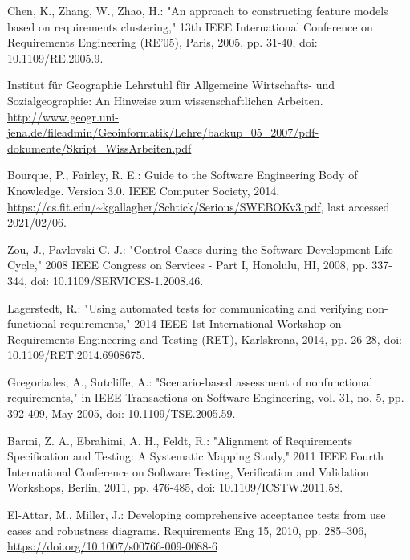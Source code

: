 \documentclass[a4paper,10pt, bibliography=totocnumbered]{scrreprt}
\begin{document}
\begin{thebibliography}{9}

 Chen, K., Zhang, W., Zhao, H.: "An approach to constructing feature models based on requirements clustering," 13th IEEE International Conference on Requirements Engineering (RE'05), Paris, 2005, pp. 31-40, doi: 10.1109/RE.2005.9.

 Institut für Geographie   
Lehrstuhl für Allgemeine Wirtschafts- und Sozialgeographie: An Hinweise zum wissenschaftlichen Arbeiten.
\url{http://www.geogr.uni-jena.de/fileadmin/Geoinformatik/Lehre/backup_05_2007/pdf-dokumente/Skript_WissArbeiten.pdf}

 Bourque, P., Fairley, R. E.: Guide to the Software Engineering Body of Knowledge. Version 3.0.
IEEE Computer Society, 2014. \url{https://cs.fit.edu/~kgallagher/Schtick/Serious/SWEBOKv3.pdf}, last accessed 2021/02/06.

 Zou, J., Pavlovski C. J.: "Control Cases during the Software Development Life-Cycle," 2008 IEEE Congress on Services - Part I, Honolulu, HI, 2008, pp. 337-344, doi: 10.1109/SERVICES-1.2008.46.

 Lagerstedt, R.: "Using automated tests for communicating and verifying non-functional requirements," 2014 IEEE 1st International Workshop on Requirements Engineering and Testing (RET), Karlskrona, 2014, pp. 26-28, doi: 10.1109/RET.2014.6908675.

 Gregoriades, A., Sutcliffe, A.: "Scenario-based assessment of nonfunctional requirements," in IEEE Transactions on Software Engineering, vol. 31, no. 5, pp. 392-409, May 2005, doi: 10.1109/TSE.2005.59.

 Barmi, Z. A., Ebrahimi, A. H., Feldt, R.: "Alignment of Requirements Specification and Testing: A Systematic Mapping Study," 2011 IEEE Fourth International Conference on Software Testing, Verification and Validation Workshops, Berlin, 2011, pp. 476-485, doi: 10.1109/ICSTW.2011.58.

 El-Attar, M., Miller, J.: Developing comprehensive acceptance tests from use cases and robustness diagrams. Requirements Eng 15, 2010, pp. 285–306, \url{https://doi.org/10.1007/s00766-009-0088-6}


\end{thebibliography}
\end{document}
